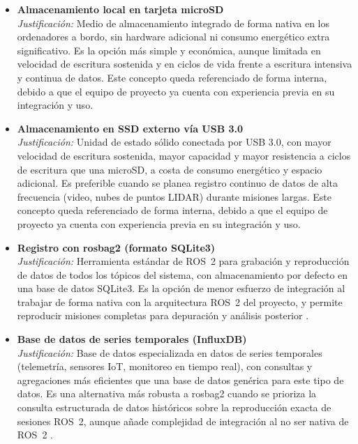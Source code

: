 \begin{itemize}
  \item \textbf{Almacenamiento local en tarjeta microSD} \\
  \textit{Justificación:} Medio de almacenamiento integrado de forma nativa en los ordenadores a 
  bordo, sin hardware adicional ni consumo energético extra 
  significativo. Es la opción más simple y económica, aunque limitada en velocidad de escritura 
  sostenida y en ciclos de vida frente a escritura intensiva y continua de datos. Este concepto
  queda referenciado de forma interna, debido a que el equipo de proyecto ya cuenta con experiencia previa 
  en su integración y uso. 

  \item \textbf{Almacenamiento en SSD externo vía USB 3.0} \\
  \textit{Justificación:} Unidad de estado sólido conectada por USB 3.0, con mayor velocidad de 
  escritura sostenida, mayor capacidad y mayor resistencia a ciclos de escritura que una microSD, 
  a costa de consumo energético y espacio adicional. Es preferible cuando se planea registro 
  continuo de datos de alta frecuencia (video, nubes de puntos LIDAR) durante misiones largas.
  Este concepto queda referenciado de forma interna, debido a que el equipo de proyecto ya cuenta 
  con experiencia previa en su integración y uso. 

  \item \textbf{Registro con rosbag2 (formato SQLite3)} \\
  \textit{Justificación:} Herramienta estándar de ROS~2 para grabación y reproducción de datos de 
  todos los tópicos del sistema, con almacenamiento por defecto en una base de datos SQLite3. Es 
  la opción de menor esfuerzo de integración al trabajar de forma nativa con la arquitectura ROS~2 
  del proyecto, y permite reproducir misiones completas para depuración y análisis posterior \cite{Cite18}. \\


  \item \textbf{Base de datos de series temporales (InfluxDB)} \\
  \textit{Justificación:} Base de datos especializada en datos de series temporales (telemetría, 
  sensores IoT, monitoreo en tiempo real), con consultas y agregaciones más eficientes que una 
  base de datos genérica para este tipo de datos. Es una alternativa más robusta a rosbag2 cuando 
  se prioriza la consulta estructurada de datos históricos sobre la reproducción exacta de 
  sesiones ROS~2, aunque añade complejidad de integración al no ser nativa de ROS~2 \cite{Cite19}. \\

\end{itemize}

